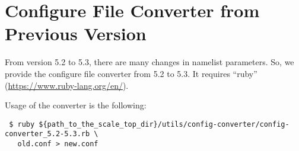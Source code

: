 \section{Configure File Converter from Previous Version}

From version 5.2 to 5.3, there are many changes in namelist parameters.
So, we provide the configure file converter from 5.2 to 5.3.
It requires ``ruby'' (\url{https://www.ruby-lang.org/en/}).

Usage of the converter is the following:
\begin{verbatim}
 $ ruby ${path_to_the_scale_top_dir}/utils/config-converter/config-converter_5.2-5.3.rb \
   old.conf > new.conf
\end{verbatim}
